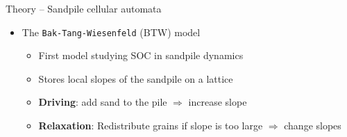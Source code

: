 \documentclass[xcolor=dvipsnames]{beamer}
\newcommand{\myitemsep}{\setlength\itemsep{0.33cm}}
\newcommand{\mysubitemsep}{\setlength\itemsep{0.22cm}}
\begin{document}
    \begin{frame}[t]{Theory -- Sandpile cellular automata}
        \begin{itemize}\myitemsep
            \item<1-> The \texttt{Bak-Tang-Wiesenfeld} (BTW) model
                \begin{itemize}\mysubitemsep
                    \item<2->[$\bullet$] First model studying SOC in sandpile dynamics
                    \item<2->[$\bullet$] Stores local slopes of the sandpile on a lattice
                    \item<2->[$\bullet$] \textbf{Driving}: add sand to the pile $\Rightarrow$ increase slope
                    \item<2->[$\bullet$] \textbf{Relaxation}: Redistribute grains if slope is too large
                                                              $\Rightarrow$ change slopes
                \end{itemize}
        \end{itemize}
\end{frame}
\end{document}
